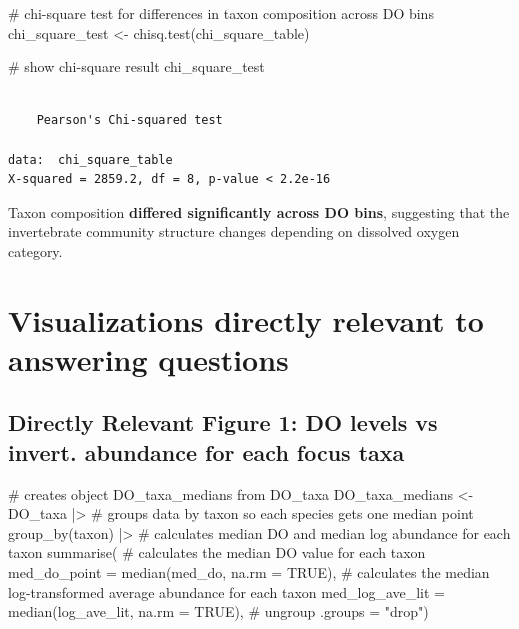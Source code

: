 \documentclass[
  letterpaper,
  DIV=11,
  numbers=noendperiod]{scrartcl}
\newenvironment{Shaded}{\begin{snugshade}}{\end{snugshade}}
\newcommand{\AttributeTok}[1]{\textcolor[rgb]{0.40,0.45,0.13}{#1}}
\newcommand{\CommentTok}[1]{\textcolor[rgb]{0.37,0.37,0.37}{#1}}
\newcommand{\ConstantTok}[1]{\textcolor[rgb]{0.56,0.35,0.01}{#1}}
\newcommand{\FunctionTok}[1]{\textcolor[rgb]{0.28,0.35,0.67}{#1}}
\newcommand{\NormalTok}[1]{\textcolor[rgb]{0.00,0.23,0.31}{#1}}
\newcommand{\OtherTok}[1]{\textcolor[rgb]{0.00,0.23,0.31}{#1}}
\newcommand{\SpecialCharTok}[1]{\textcolor[rgb]{0.37,0.37,0.37}{#1}}
\newcommand{\StringTok}[1]{\textcolor[rgb]{0.13,0.47,0.30}{#1}}
\begin{document}
\begin{Shaded}
\begin{Highlighting}[]
\CommentTok{\# chi{-}square test for differences in taxon composition across DO bins}
\NormalTok{chi\_square\_test }\OtherTok{\textless{}{-}} \FunctionTok{chisq.test}\NormalTok{(chi\_square\_table)}

\CommentTok{\# show chi{-}square result}
\NormalTok{chi\_square\_test}
\end{Highlighting}
\end{Shaded}

\begin{verbatim}

    Pearson's Chi-squared test

data:  chi_square_table
X-squared = 2859.2, df = 8, p-value < 2.2e-16
\end{verbatim}

Taxon composition \textbf{differed significantly across DO bins},
suggesting that the invertebrate community structure changes depending
on dissolved oxygen category.

\section{Visualizations directly relevant to answering
questions}\label{visualizations-directly-relevant-to-answering-questions}

\subsection{Directly Relevant Figure 1: DO levels vs invert. abundance
for each focus
taxa}\label{directly-relevant-figure-1-do-levels-vs-invert.-abundance-for-each-focus-taxa}

\begin{Shaded}
\begin{Highlighting}[]
\CommentTok{\# creates object DO\_taxa\_medians from DO\_taxa}
\NormalTok{DO\_taxa\_medians }\OtherTok{\textless{}{-}}\NormalTok{ DO\_taxa }\SpecialCharTok{|\textgreater{}}
  \CommentTok{\# groups data by taxon so each species gets one median point}
  \FunctionTok{group\_by}\NormalTok{(taxon) }\SpecialCharTok{|\textgreater{}}
  \CommentTok{\# calculates median DO and median log abundance for each taxon}
  \FunctionTok{summarise}\NormalTok{(}
    \CommentTok{\# calculates the median DO value for each taxon}
    \AttributeTok{med\_do\_point =} \FunctionTok{median}\NormalTok{(med\_do, }\AttributeTok{na.rm =} \ConstantTok{TRUE}\NormalTok{),}
    \CommentTok{\# calculates the median log{-}transformed average abundance for each taxon}
    \AttributeTok{med\_log\_ave\_lit =} \FunctionTok{median}\NormalTok{(log\_ave\_lit, }\AttributeTok{na.rm =} \ConstantTok{TRUE}\NormalTok{),}
    \CommentTok{\# ungroup}
    \AttributeTok{.groups =} \StringTok{"drop"}\NormalTok{)}
\end{Highlighting}
\end{Shaded}
\end{document}
